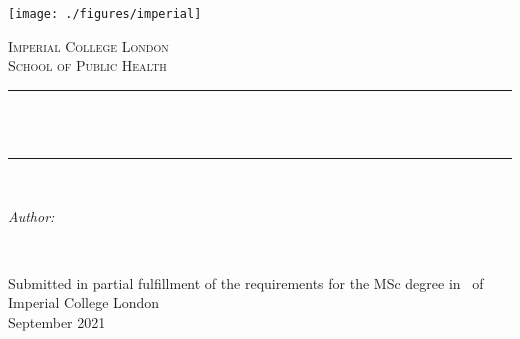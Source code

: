 \begin{titlepage}

    \newcommand{\HRule}{\rule{\linewidth}{0.5mm}} %
    
    
    
    \texttt{[image: ./figures/imperial]}\\[0.5cm] 
    
    \center %
    
    
    \textsc{\Large Imperial College London}\\[0.5cm] 
    \textsc{\large School of Public Health}\\[0.5cm] 
    
    
    \HRule \\[0.4cm]
    { \huge \bfseries \reporttitle}\\ %
    \HRule \\[1.5cm]
     
    
    \begin{minipage}{0.4\textwidth}
    \begin{flushleft} \large
    \emph{Author:}\\
    \reportauthor %
    \end{flushleft}
    \end{minipage}
    ~
    
    
    
    \vfill %
    Submitted in partial fulfillment of the requirements for the MSc degree in
    \degreetype~of Imperial College London\\[0.5cm]
    
    \makeatletter
    September 2021
    \makeatother
    
    
    \end{titlepage}
    
